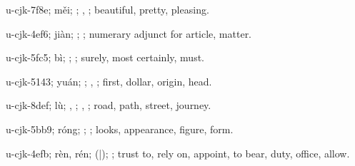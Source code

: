 \begin{multicols}{2}
{\cjkgGlue{}u-cjk-7f8e; měi; \cjkgGlue{}\cjkgGlue{}\cjkgGlue{}; \cjkgGlue{}, \cjkgGlue{}; beautiful, pretty, pleasing.

\cjkgGlue{}u-cjk-4ef6; jiàn; \cjkgGlue{}; \cjkgGlue{}; numerary adjunct for article, matter.

\cjkgGlue{}u-cjk-5fc5; bì; \cjkgGlue{}\cjkgGlue{}\cjkgGlue{}; \cjkgGlue{}; surely, most certainly, must.

\cjkgGlue{}u-cjk-5143; yuán; \cjkgGlue{}; \cjkgGlue{}, \cjkgGlue{}; first, dollar, origin, head.

\cjkgGlue{}u-cjk-8def; lù; \cjkgGlue{}, \cjkgGlue{}; \cjkgGlue{}, \cjkgGlue{}; road, path, street, journey.

\cjkgGlue{}u-cjk-5bb9; róng; \cjkgGlue{}\cjkgGlue{}\cjkgGlue{}; \cjkgGlue{}; looks, appearance, figure, form.

\cjkgGlue{}u-cjk-4efb; rèn, rén; \cjkgGlue{}\cjkgGlue{}(\cjkgGlue{}|\cjkgGlue{}); \cjkgGlue{}; trust to, rely on, appoint, to bear, duty, office, allow.

}
\end{multicols}
